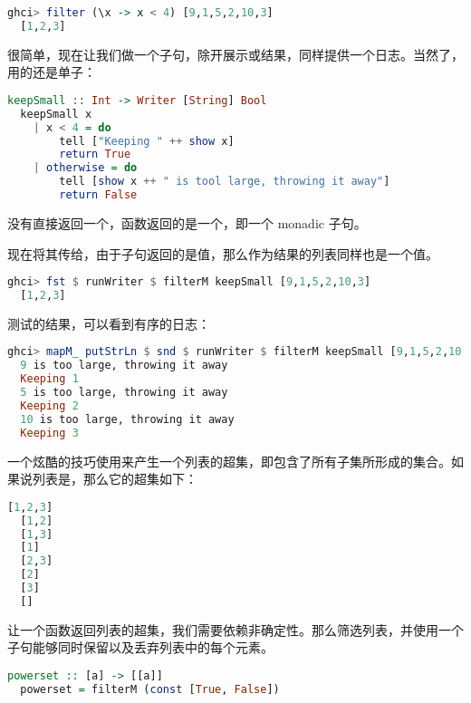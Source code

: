 \documentclass[./main.tex]{subfiles}
\begin{document}
\begin{lstlisting}[language=Haskell]
  ghci> filter (\x -> x < 4) [9,1,5,2,10,3]
  [1,2,3]
\end{lstlisting}

很简单，现在让我们做一个子句，除开展示或结果，同样提供一个日志。当然了，用的还是单子：

\begin{lstlisting}[language=Haskell]
  keepSmall :: Int -> Writer [String] Bool
  keepSmall x
    | x < 4 = do
        tell ["Keeping " ++ show x]
        return True
    | otherwise = do
        tell [show x ++ " is tool large, throwing it away"]
        return False
\end{lstlisting}

没有直接返回一个，函数返回的是一个，即一个 monadic 子句。

现在将其传给，由于子句返回的是值，那么作为结果的列表同样也是一个值。

\begin{lstlisting}[language=Haskell]
  ghci> fst $ runWriter $ filterM keepSmall [9,1,5,2,10,3]
  [1,2,3]
\end{lstlisting}

测试的结果，可以看到有序的日志：

\begin{lstlisting}[language=Haskell]
  ghci> mapM_ putStrLn $ snd $ runWriter $ filterM keepSmall [9,1,5,2,10,3]
  9 is too large, throwing it away
  Keeping 1
  5 is too large, throwing it away
  Keeping 2
  10 is too large, throwing it away
  Keeping 3
\end{lstlisting}

一个炫酷的技巧使用来产生一个列表的超集，即包含了所有子集所形成的集合。如果说列表是\acode{[1,2,3]}，那么它的超集如下：

\begin{lstlisting}[language=Haskell]
  [1,2,3]
  [1,2]
  [1,3]
  [1]
  [2,3]
  [2]
  [3]
  []
\end{lstlisting}

让一个函数返回列表的超集，我们需要依赖非确定性。那么筛选列表，并使用一个子句能够同时保留以及丢弃列表中的每个元素。

\begin{lstlisting}[language=Haskell]
  powerset :: [a] -> [[a]]
  powerset = filterM (const [True, False])
\end{lstlisting}
\end{document}
